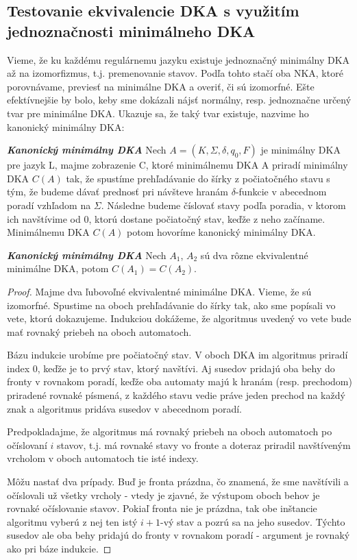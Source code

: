 \subsection{Testovanie ekvivalencie DKA s využitím jednoznačnosti minimálneho DKA}
Vieme, že ku každému regulárnemu jazyku existuje jednoznačný minimálny DKA až na izomorfizmus, t.j. premenovanie stavov. Podľa tohto stačí oba NKA, ktoré porovnávame, previesť na minimálne DKA a overiť, či sú izomorfné. Ešte efektívnejšie by bolo, keby sme dokázali nájsť normálny, resp. jednoznačne určený tvar pre minimálne DKA. Ukazuje sa, že taký tvar existuje, nazvime ho kanonický minimálny DKA:
\\

\label{kanMinDKA}
\begin{defn}{\textbf {\textit {Kanonický minimálny DKA}}} Nech $A = (K,\Sigma,\delta,q_0,F)$ je minimálny DKA pre jazyk L, majme zobrazenie C, ktoré minimálnemu DKA A priradí minimálny DKA $C(A)$ tak, že spustíme prehľadávanie do šírky z počiatočného stavu s tým, že budeme dávať prednosť pri návšteve hranám $\delta$-funkcie v abecednom poradí vzhľadom na $\Sigma$. Následne budeme číslovať stavy podľa poradia, v ktorom ich navštívime od 0, ktorú dostane počiatočný stav, keďže z neho začíname. Minimálnemu DKA $C(A)$ potom hovoríme kanonický minimálny DKA.
\end{defn}

\begin{thm}{\textbf {\textit {Kanonický minimálny DKA}}} Nech $A_1$, $A_2$ sú dva rôzne ekvivalentné minimálne DKA, potom $C(A_1) = C(A_2)$.
\end{thm}

\begin{proof} Majme dva ľubovoľné ekvivalentné minimálne DKA. Vieme, že sú izomorfné. Spustime na oboch prehľadávanie do šírky tak, ako sme popísali vo vete, ktorú dokazujeme. Indukciou dokážeme, že algoritmus uvedený vo vete bude mať rovnaký priebeh na oboch automatoch.

Bázu indukcie urobíme pre počiatočný stav. V oboch DKA im algoritmus priradí index 0, keďže je to prvý stav, ktorý navštívi. Aj susedov pridajú oba behy do fronty v rovnakom poradí, keďže oba automaty majú k hranám (resp. prechodom) priradené rovnaké písmená, z každého stavu vedie práve jeden prechod na každý znak a algoritmus pridáva susedov v abecednom poradí.

Predpokladajme, že algoritmus má rovnaký priebeh na oboch automatoch po očíslovaní $i$ stavov, t.j. má rovnaké stavy vo fronte a doteraz priradil navštíveným vrcholom v oboch automatoch tie isté indexy. 

Môžu nastať dva prípady. Buď je fronta prázdna, čo znamená, že sme navštívili a očíslovali už všetky vrcholy - vtedy je zjavné, že výstupom oboch behov je rovnaké očíslovanie stavov. Pokiaľ fronta nie je prázdna, tak obe inštancie algoritmu vyberú z nej ten istý $i+1$-vý stav a pozrú sa na jeho susedov. Týchto susedov ale oba behy pridajú do fronty v rovnakom poradí - argument je rovnaký ako pri báze indukcie. 
\end{proof}


